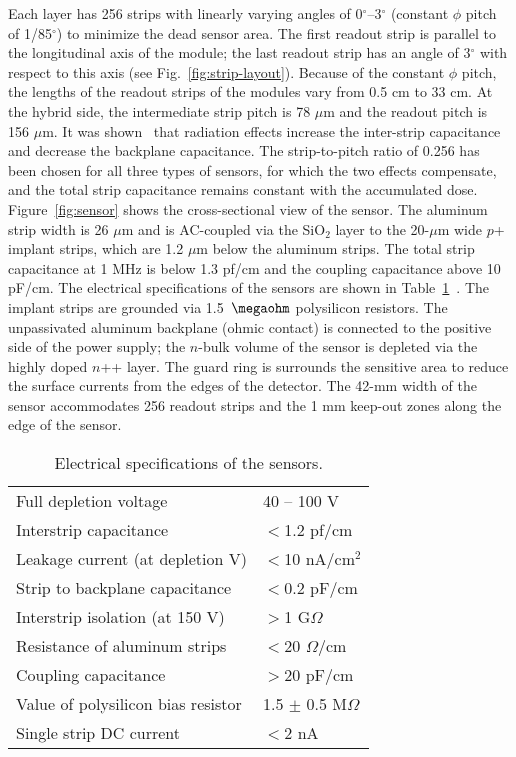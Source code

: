 Each layer has 256 strips with linearly varying angles of 0$^\circ$--3$^\circ$ (constant $\phi$ pitch of 1/85$^\circ$) to minimize the dead sensor area. The first readout strip is parallel to the longitudinal axis of the module; the last readout strip has an angle of 3$^\circ$ with respect to this axis (see Fig.~\ref{fig:strip-layout}). Because of the constant $\phi$ pitch, the lengths of the readout strips of the modules vary from 0.5 cm to 33 cm. At the hybrid side, the intermediate strip pitch is 78 $\mu$m and the readout pitch is 156 $\mu$m. It was shown~\cite{BRAIBANTNOTE} that radiation effects increase the inter-strip capacitance and decrease the backplane capacitance. The strip-to-pitch ratio of 0.256 has been chosen for all three types of sensors, for which the two effects compensate, and the total strip capacitance remains constant with the accumulated dose. Figure~\ref{fig:sensor} shows the cross-sectional view of the sensor. The aluminum strip width is 26 $\mu$m and is AC-coupled via the SiO$_2$ layer to the 20-$\mu$m wide $p$+ implant strips, which are 1.2 $\mu$m below the aluminum strips. The total strip capacitance at 1 MHz is below 1.3 pf/cm and the coupling capacitance above 10 pF/cm. The electrical specifications of the sensors are shown in Table~\ref{tab:sensor-table}~\cite{SENSORNOTE}. The implant strips are grounded via 1.5~$\megaohm$ polysilicon resistors. The unpassivated aluminum backplane (ohmic contact) is connected to the positive side of the power supply; the $n$-bulk volume of the sensor is depleted via the highly doped $n$++ layer. The guard ring is surrounds the sensitive area to reduce the surface currents from the edges of the detector. The 42-mm width of the sensor accommodates 256 readout strips and the 1 mm keep-out zones along the edge of the sensor.

\begin{table}[h]
\begin{tabular}{ll}
\hline
Full depletion voltage      & 40 -- 100 V \\ 
Interstrip capacitance      & $<$1.2 pf/cm                       \\
Leakage current (at depletion V)        & $<$10 nA/cm$^2$                       \\
Strip to backplane capacitance        & $<$0.2 pF/cm                       \\
Interstrip isolation (at 150 V)           & $>$1 G$\Omega$                       \\ 
Resistance of aluminum strips        & $<$20 $\Omega$/cm                       \\
Coupling capacitance        & $>$20 pF/cm                       \\
Value of polysilicon bias resistor   & 1.5 $\pm$ 0.5 M$\Omega$     \\
Single strip DC current & $<$2 nA\\ \hline
\end{tabular}
\caption{Electrical specifications of the sensors.}
\label{tab:sensor-table}
\end{table}

